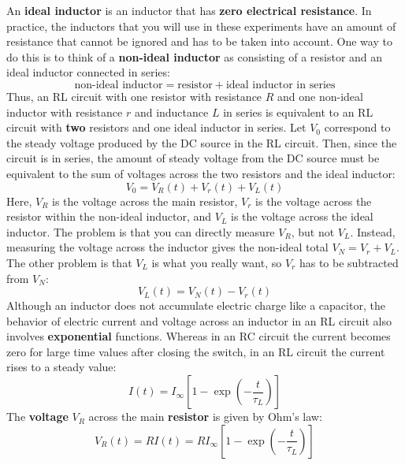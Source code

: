 An \textbf{ideal inductor} is an inductor that has \textbf{zero electrical resistance}. In practice, the inductors that you will use in these experiments have an amount of resistance that cannot be ignored and has to be taken into account. One way to do this is to think of a \textbf{non-ideal inductor} as consisting of a resistor and an ideal inductor connected in series:
\begin{equation}
    \text{non-ideal inductor} = \text{resistor} + \text{ideal inductor in series}
\end{equation}
Thus, an RL circuit with one resistor with resistance $R$ and one non-ideal inductor with resistance $r$ and inductance $L$ in series is equivalent to an RL circuit with \textbf{two} resistors and one ideal inductor in series. Let $V_{0}$ correspond to the steady voltage produced by the DC source in the RL circuit. Then, since the circuit is in series, the amount of steady voltage from the DC source must be equivalent to the sum of voltages across the two resistors and the ideal inductor:
\begin{equation}
    V_{0} = V_{R}(t) + V_{r}(t) + V_{L}(t)
\end{equation}
Here, $V_{R}$ is the voltage across the main resistor, $V_{r}$ is the voltage across the resistor within the non-ideal inductor, and $V_{L}$ is the voltage across the ideal inductor. The problem is that you can directly measure $V_{R}$, but not $V_{L}$. Instead, measuring the voltage across the inductor gives the non-ideal total $V_{N} = V_{r} + V_{L}$. The other problem is that $V_{L}$ is what you really want, so $V_{r}$ has to be subtracted from $V_{N}$:
\begin{equation}
    V_{L}(t) = V_{N}(t) - V_{r}(t)
\end{equation}
Although an inductor does not accumulate electric charge like a capacitor, the behavior of electric current and voltage across an inductor in an RL circuit also involves \textbf{exponential} functions. Whereas in an RC circuit the current becomes zero for large time values after closing the switch, in an RL circuit the current rises to a steady value:
\begin{equation}
    I(t) = I_{\infty} \left[ 1 - \exp\left(- \frac{t}{\tau_{L}}\right) \right]
    \label{eq.05.RL.i.rise}
\end{equation}
The \textbf{voltage} $V_{R}$ across the main \textbf{resistor} is given by Ohm's law:
\begin{equation}
    V_{R}(t) = R I(t) = R I_{\infty} \left[ 1 - \exp\left(- \frac{t}{\tau_{L}}\right) \right]
    \label{eq.05.RL.vR}
\end{equation}
